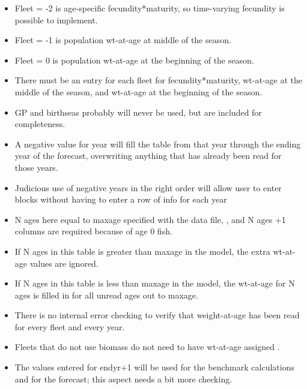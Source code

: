 \begin{itemize}
	\item Fleet = -2 is age-specific fecundity*maturity, so time-varying fecundity is possible to implement.
	\item Fleet = -1 is population wt-at-age at middle of the season.
	\item Fleet = 0 is population wt-at-age at the beginning of the season.
	\item There must be an entry for each fleet for fecundity*maturity, wt-at-age at the middle of the season, and wt-at-age at the beginning of the season.
	\item GP and birthseas probably will never be used, but are included for completeness.
	\item A negative value for year will fill the table from that year through the ending year of the forecast, overwriting anything that has already been read for those years.
	\item Judicious use of negative years in the right order will allow user to enter blocks without having to enter a row of info for each year
	\item N ages here equal to maxage specified with the data file, , and N ages +1 columns are required because of age 0 fish.
	\item If N ages in this table is greater than maxage in the model, the extra wt-at-age values are ignored.
	\item If N ages in this table is less than maxage in the model, the wt-at-age for N ages is filled in for all unread ages out to maxage.
	\item There is no internal error checking to  verify that weight-at-age has been read for every fleet and every year. 
	\item Fleets that do not use biomass do not need to have wt-at-age assigned	.
	\item The values entered for endyr+1 will be used for the benchmark calculations and for the forecast; this aspect needs a bit more checking.
\end{itemize}

